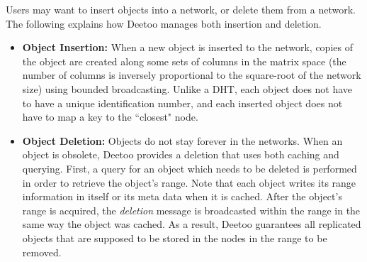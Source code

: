\documentclass[conference]{IEEEtran}
\begin{document}
Users may want to insert objects into a network, or delete them from a network.
The following explains how Deetoo manages both insertion and deletion.
\begin{itemize}
\item \textbf{Object Insertion: } When a new object is inserted to the network,
copies of the object are created along some sets of columns in the matrix
space (the number of columns is inversely proportional to the square-root
of the network size) using bounded broadcasting. Unlike a DHT, each object does not have to have a
unique identification number, and each inserted object does not have
to map a key to the ``closest" node.

\item \textbf{Object Deletion: }Objects do not stay forever in the networks.
When an object is obsolete, Deetoo provides a deletion that uses both 
caching and querying.
First, a query for an object which needs to be deleted is performed in order 
to retrieve the object's range. Note that each object writes its range information 
in itself or its meta data when it is cached. After the object's range is acquired, 
the \emph{deletion} message is broadcasted within the range in the same way the object
was cached. As a result, Deetoo guarantees all replicated objects that are 
supposed to be stored in the nodes in the range to be removed.
\end{itemize}
\end{document}
